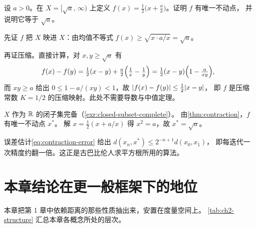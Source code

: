 \begin{example}[用压缩映射求平方根]
  \label{ex:sqrt-newton}
  设 \(a>0\)。在 \(X = [\sqrt{a},\,\infty)\) 上定义
  \(f(x) = \frac{1}{2}\bigl(x + \frac{a}{x}\bigr)\)。证明 \(f\) 有唯一不动点，
  并说明它等于 \(\sqrt{a}\)。
  \begin{worked}
    先证 \(f\) 把 \(X\) 映进 \(X\)：由均值不等式
    \(f(x) \ge \sqrt{x \cdot a/x} = \sqrt{a}\)。

    再证压缩。直接计算，对 \(x,y \ge \sqrt{a}\) 有
    \[
      f(x)-f(y) = \tfrac{1}{2}(x-y) + \tfrac{a}{2}\Bigl(\tfrac{1}{x}-\tfrac{1}{y}\Bigr)
                = \tfrac{1}{2}(x-y)\Bigl(1 - \tfrac{a}{xy}\Bigr),
    \]
    而 \(xy \ge a\) 给出 \(0 \le 1 - a/(xy) < 1\)，故
    \(\lvert f(x)-f(y)\rvert \le \tfrac{1}{2}\lvert x-y\rvert\)，
    即 \(f\) 是压缩常数 \(K=1/2\) 的压缩映射。此处不需要导数与中值定理。

    \(X\) 作为 \(\mathbb{R}\) 的闭子集完备（\cref{exr:closed-subset-complete}）。
    由\cref{thm:contraction}，\(f\) 有唯一不动点 \(x^{*}\)。
    解 \(x = \frac{1}{2}(x+a/x)\) 得 \(x^{2}=a\)，故 \(x^{*}=\sqrt{a}\)。

    误差估计\cref{eq:contraction-error} 给出 \(d(x_{n},x^{*}) \le 2^{-n+1}d(x_{0},x_{1})\)，
    即每迭代一次精度约翻一倍。这正是古巴比伦人求平方根所用的算法。
  \end{worked}
\end{example}

\section{本章结论在更一般框架下的地位}
\label{sec:ch2-outlook}

本章把第 1 章中依赖距离的那些性质抽出来，安置在度量空间上。
\cref{tab:ch2-structure} 汇总本章各概念所处的层次。

